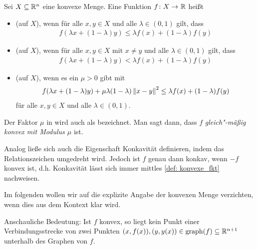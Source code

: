 \documentclass[ %
ngerman, %
a4paper, 
11pt,%
sectionreset, %
chapterstyle=framed, %
sectionstyle=pure, %
titlefont=osfamily %
]{../texmf/tex/latex/mathscriptMathTUD/mathscriptMathTUD}
\begin{document}
\begin{definition} \label{def: konvexe_fkt}
	Sei $X \subseteq \mathbb{R}^n$ eine konvexe Menge. Eine Funktion $\abb{f}{X}{\R}$ heißt
	\begin{itemize}[leftmargin=*, nolistsep]
		\item {} (auf $X$), wenn für alle $x,y \in X$ und alle $\lambda \in (0,1)$ gilt, dass
		\begin{align} \label{eq: konvexe_fkt}
			f(\lambda x + (1-\lambda)y) \leq \lambda f(x) + (1-\lambda) f(y)
		\end{align}
		\item {} (auf $X$), wenn für alle $x,y \in X$ mit $x \neq y$ und alle $\lambda \in (0,1)$ gilt, dass
		\begin{align} \label{eq: strikt_konvex}
			f(\lambda x + (1-\lambda)y) < \lambda f(x) + (1-\lambda) f(y)
		\end{align}
		\item {} (auf $X$), wenn es ein $\mu > 0$ gibt mit 
		\begin{align} \label{eq: gleichmaessig_konvex}
			f(\lambda x + (1-\lambda)y) + \mu \lambda (1-\lambda) \left\lVert x-y \right\rVert^2 \leq \lambda f(x) + (1-\lambda) f(y)
		\end{align}
		für alle $x,y \in X$ und alle $\lambda \in (0,1)$.
	\end{itemize}
\end{definition}

\begin{bemerkung}
	Der Faktor $\mu$ in  wird auch als  bezeichnet. Man sagt dann, dass $f$ \textit{gleich"-mäßig konvex mit Modulus $\mu$} ist.
	
	Analog ließe sich auch die Eigenschaft Konkavität definieren, indem das Relationszeichen umgedreht wird. Jedoch ist $f$ genau dann konkav, wenn $-f$ konvex ist, d.h. Konkavität lässt sich immer mittles \cref{def: konvexe_fkt} nachweisen.
	
	Im folgenden wollen wir auf die explizite Angabe der konvexen Menge verzichten, wenn dies aus dem Kontext klar wird.
	
	Anschauliche Bedeutung:
	Ist $f$ konvex, so liegt kein Punkt einer Verbindungsstrecke von zwei Punkten $(x,f(x)) , (y,y(x)) \in \operatorname{graph}(f) \subseteq \mathbb{R}^{n+1}$ unterhalb des Graphen von $f$.
\end{bemerkung}

\end{document}
